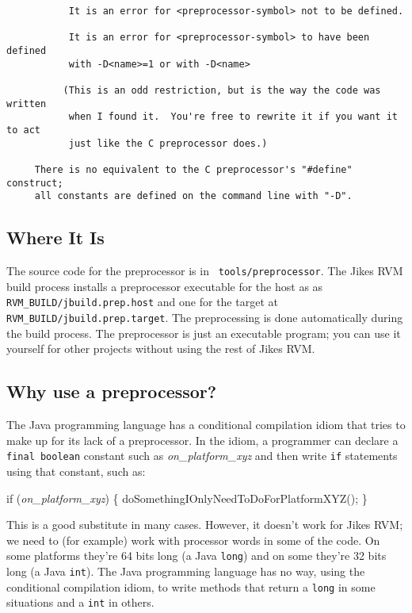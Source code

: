 \begin{verbatim}
           It is an error for <preprocessor-symbol> not to be defined.

           It is an error for <preprocessor-symbol> to have been defined
           with -D<name>=1 or with -D<name>

          (This is an odd restriction, but is the way the code was written
           when I found it.  You're free to rewrite it if you want it to act
           just like the C preprocessor does.)

     There is no equivalent to the C preprocessor's "#define" construct;
     all constants are defined on the command line with "-D".
\end{verbatim}

\subsection{Where It Is}

The source code for the preprocessor is in {\tt
  tools/preprocessor}.  The Jikes RVM build process installs a
preprocessor executable for the host as as {\tt
  RVM\_BUILD/jbuild.prep.host} and one for the target at {\tt
  RVM\_BUILD/jbuild.prep.target}.  The preprocessing is done
automatically during the build process.  The preprocessor is just an
executable program; you can use it yourself for other projects without
using the rest of Jikes RVM.\@


\subsection{Why use a preprocessor?}

The Java programming language has a conditional compilation idiom that tries to make up for its
lack of a preprocessor.  In the idiom, a programmer can
declare a {\tt final boolean} constant such as {\it on\_platform\_xyz}
and then write {\tt if} statements using that constant, such as:
\begin{example}
if ({\it on\_platform\_xyz}) \{
   doSomethingIOnlyNeedToDoForPlatformXYZ();
\}    
\end{example}

This is a good substitute in many cases.  However, it doesn't work for
Jikes RVM; we need to (for example) work with processor words in some of
the code.  On some platforms they're 64 bits long (a Java {\tt long})
and on some they're 32 bits long (a Java {\tt int}).  The Java
programming language has no way,
using the conditional compilation idiom, to write methods that return
a {\tt long} in some situations and a {\tt int} in others.

